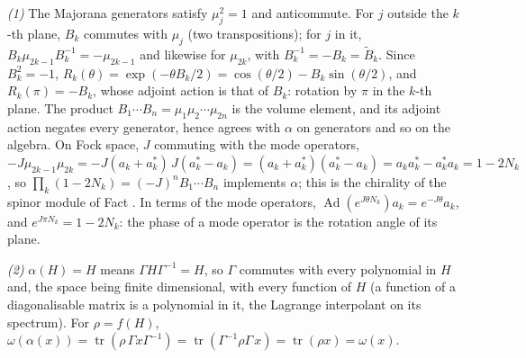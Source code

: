 \emph{(1)} The Majorana generators satisfy $\mu_j^2 = 1$ and anticommute. For $j$ outside the $k$-th plane, $B_k$ commutes with $\mu_j$ (two transpositions); for $j$ in it, $B_k \mu_{2k-1} B_k^{-1} = -\mu_{2k-1}$ and likewise for $\mu_{2k}$, with $B_k^{-1} = -B_k = \tilde B_k$. Since $B_k^2 = -1$, $R_k(\theta) = \exp(-\theta B_k/2) = \cos(\theta/2) - B_k\sin(\theta/2)$, and $R_k(\pi) = -B_k$, whose adjoint action is that of $B_k$: rotation by $\pi$ in the $k$-th plane. The product $B_1 \cdots B_n = \mu_1 \mu_2 \cdots \mu_{2n}$ is the volume element, and its adjoint action negates every generator, hence agrees with $\alpha$ on generators and so on the algebra. On Fock space, $J$ commuting with the mode operators, $-J \mu_{2k-1}\mu_{2k} = -J(a_k + a_k^*)\,J(a_k^* - a_k) = (a_k + a_k^*)(a_k^* - a_k) = a_k a_k^* - a_k^* a_k = 1 - 2N_k$, so $\prod_k(1 - 2N_k) = (-J)^n B_1\cdots B_n$ implements $\alpha$; this is the chirality of the spinor module of Fact . In terms of the mode operators, $\operatorname{Ad}(e^{J\theta N_k})a_k = e^{-J\theta}a_k$, and $e^{J\pi N_k} = 1 - 2N_k$: the phase of a mode operator is the rotation angle of its plane.

\emph{(2)} $\alpha(H) = H$ means $\Gamma H \Gamma^{-1} = H$, so $\Gamma$ commutes with every polynomial in $H$ and, the space being finite dimensional, with every function of $H$ (a function of a diagonalisable matrix is a polynomial in it, the Lagrange interpolant on its spectrum). For $\rho = f(H)$, $\omega(\alpha(x)) = \operatorname{tr}(\rho\,\Gamma x \Gamma^{-1}) = \operatorname{tr}(\Gamma^{-1}\rho\Gamma\, x) = \operatorname{tr}(\rho x) = \omega(x)$.

